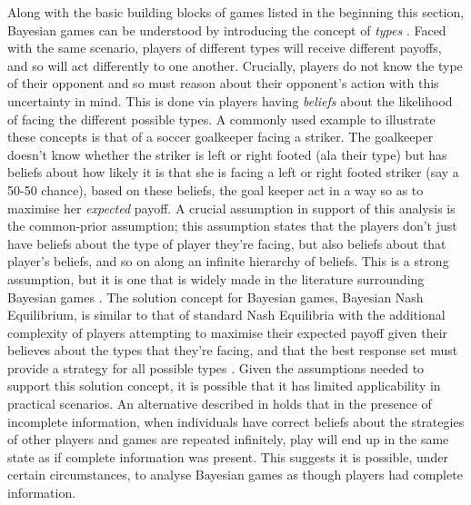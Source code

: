 \documentclass[11pt]{article}
\newcommand*{\np}{\par\noindent\newline}
\begin{document}
\np Along with the basic building blocks of games listed in the beginning this section, Bayesian games can be understood
by introducing the concept of \textit{types} \citep[~p. 167]{shoham_multiagent_2008}. Faced with the same scenario,
players of different types will receive different payoffs, and so will act differently to one another. Crucially,
players do not know the type of their opponent and so must reason about their opponent's action with this uncertainty in
mind. This is done via players having \textit{beliefs} about the likelihood of facing the different possible types. A
commonly used example to illustrate these concepts is that of a soccer goalkeeper facing a striker. The goalkeeper
doesn't know whether the striker is left or right footed (ala their type) but has beliefs about how likely it is that
she is facing a left or right footed striker (say a 50-50 chance), based on these beliefs, the goal keeper act in a way
so as to maximise her \textit{expected} payoff. 
A crucial assumption in support of this analysis is the common-prior assumption; this assumption states that the players
don't just have beliefs about the type of player they're facing, but also beliefs about that player's beliefs, and so on
along an infinite hierarchy of beliefs. This is a strong assumption, but it is one that is widely made in the literature
surrounding Bayesian games \citep[~p. 164]{shoham_multiagent_2008}. The solution concept for Bayesian games, Bayesian
Nash Equilibrium, is similar to that of standard Nash Equilibria with the additional complexity of players attempting to
maximise their expected payoff given their believes about the types that they're facing, and that the best response set
must provide a strategy for all possible types \citet{shoham_multiagent_2008}. Given the assumptions needed to support
this solution concept, it is possible that it has limited applicability in practical scenarios.
An alternative described in \citet{kalai_rational_1993} holds that in the presence of incomplete information, when
individuals have correct beliefs about the strategies of other players and games are repeated infinitely, play will end
up in the same state as if complete information was present. This suggests it is possible, under certain circumstances,
to analyse Bayesian games as though players had complete information.
\end{document}
